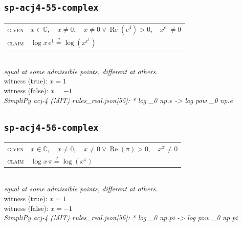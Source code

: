 \documentclass[11pt]{article}
\begin{document}
\subsection*{\texttt{sp-acj4-55-complex}}
\begin{tabular}{@{}l@{\quad}l@{}}
\textsc{given} & $x \in \mathbb{C},\quad x \neq 0,\quad x \neq 0 \lor \operatorname{Re}\left(e^{1}\right) > 0,\quad x^{e^{1}} \neq 0$ \\[4pt]
\textsc{claim} & $\displaystyle \log x \, e^{1} \overset{?}{=} \log\left(x^{e^{1}}\right)$ \\
\end{tabular}\\[2pt]
{\small\emph{equal at some admissible points, different at others.}}\\
{\footnotesize\color{gray}witness (true): $x = 1$}\\
{\footnotesize\color{gray}witness (false): $x = -1$}\\
\emph{SimpliPy acj-4 (MIT) rules\_real.json[55]: * log \_0 np.e  ->  log pow \_0 np.e}\\

\subsection*{\texttt{sp-acj4-56-complex}}
\begin{tabular}{@{}l@{\quad}l@{}}
\textsc{given} & $x \in \mathbb{C},\quad x \neq 0,\quad x \neq 0 \lor \operatorname{Re}\left(\pi\right) > 0,\quad x^{\pi} \neq 0$ \\[4pt]
\textsc{claim} & $\displaystyle \log x \, \pi \overset{?}{=} \log\left(x^{\pi}\right)$ \\
\end{tabular}\\[2pt]
{\small\emph{equal at some admissible points, different at others.}}\\
{\footnotesize\color{gray}witness (true): $x = 1$}\\
{\footnotesize\color{gray}witness (false): $x = -1$}\\
\emph{SimpliPy acj-4 (MIT) rules\_real.json[56]: * log \_0 np.pi  ->  log pow \_0 np.pi}\\
\end{document}
